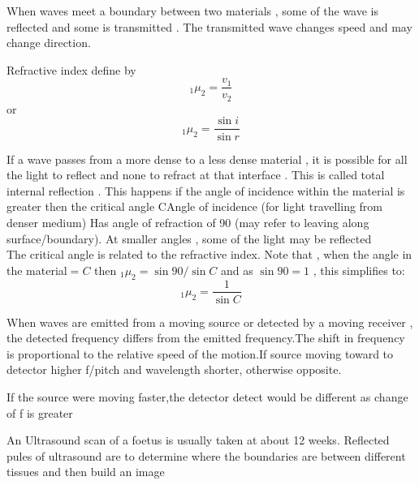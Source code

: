 \documentclass[a4paper]{article}
\begin{document}
\begin{defi}[refraction]
When waves meet a boundary between two materials , some of the wave is reflected and some is transmitted . The transmitted wave changes speed and may change direction.
\end{defi}

\begin{defi}

Refractive index define by
\begin{equation*}
    _1\mu_2=\frac{v_1}{v_2}
\end{equation*}
or
\begin{equation*}
    _1\mu_2=\frac{\sin i}{\sin r}
\end{equation*}
\end{defi}

\begin{defi}
If a wave passes from a more dense to a less dense material , it is possible for all the light to reflect and none to refract at that interface . This is called total internal reflection . This happens if the angle of incidence within the material is greater then the critical angle CAngle of incidence (for light travelling from denser medium) Has angle of refraction of 90  (may refer to leaving along surface/boundary). At smaller angles , some of the light may be reflected\\

The critical angle is related to the refractive index. Note that , when the angle in the material$=C$ then $_1\mu_2=\sin 90/\sin C$ and as $\sin 90=1$ , this simplifies to:
\begin{equation*}
    _1\mu_2=\frac{1}{\sin C}
\end{equation*}
\end{defi}

\begin{defi}
When waves are emitted from a moving source or detected by a moving receiver , the detected frequency differs from the emitted frequency.The shift in frequency is proportional to the relative speed  of the motion.If source moving toward to detector higher f/pitch and wavelength shorter, otherwise opposite.

If the source were moving faster,the detector detect would be different as change of f is greater
\end{defi}


\begin{ex}
An Ultrasound scan of a foetus is usually taken at about 12 weeks. Reflected pules of ultrasound are to determine where the boundaries are between different tissues and then build an image
\end{ex}
\end{document}
